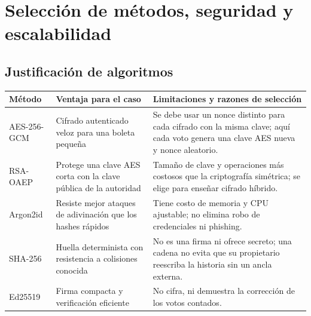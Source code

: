 \section{Selección de métodos, seguridad y escalabilidad}
\subsection{Justificación de algoritmos}
\begin{longtable}{p{2.4cm}p{4.3cm}p{6.1cm}}
\toprule Método & Ventaja para el caso & Limitaciones y razones de selección\\\midrule\endhead
AES-256-GCM & Cifrado autenticado veloz para una boleta pequeña & Se debe usar un nonce distinto para cada cifrado con la misma clave; aquí cada voto genera una clave AES nueva y nonce aleatorio.\\
RSA-OAEP & Protege una clave AES corta con la clave pública de la autoridad & Tamaño de clave y operaciones más costosos que la criptografía simétrica; se elige para enseñar cifrado híbrido.\\
Argon2id & Resiste mejor ataques de adivinación que los hashes rápidos & Tiene costo de memoria y CPU ajustable; no elimina robo de credenciales ni phishing.\\
SHA-256 & Huella determinista con resistencia a colisiones conocida & No es una firma ni ofrece secreto; una cadena no evita que su propietario reescriba la historia sin un ancla externa.\\
Ed25519 & Firma compacta y verificación eficiente & No cifra, ni demuestra la corrección de los votos contados.\\
\bottomrule
\end{longtable}

